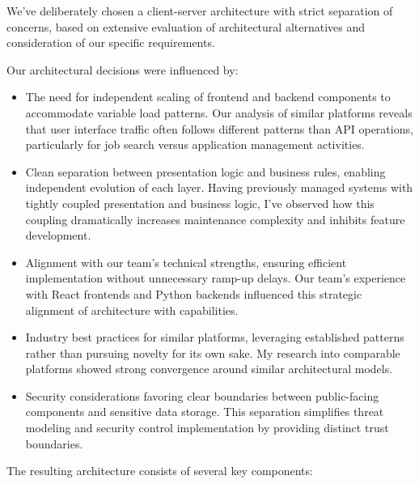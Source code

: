\documentclass[12pt,a4paper]{article}
\begin{document}
We've deliberately chosen a client-server architecture with strict separation of concerns, based on extensive evaluation of architectural alternatives and consideration of our specific requirements.

Our architectural decisions were influenced by:
\begin{itemize}
    \item The need for independent scaling of frontend and backend components to accommodate variable load patterns. Our analysis of similar platforms reveals that user interface traffic often follows different patterns than API operations, particularly for job search versus application management activities.
    \item Clean separation between presentation logic and business rules, enabling independent evolution of each layer. Having previously managed systems with tightly coupled presentation and business logic, I've observed how this coupling dramatically increases maintenance complexity and inhibits feature development.
    \item Alignment with our team's technical strengths, ensuring efficient implementation without unnecessary ramp-up delays. Our team's experience with React frontends and Python backends influenced this strategic alignment of architecture with capabilities.
    \item Industry best practices for similar platforms, leveraging established patterns rather than pursuing novelty for its own sake. My research into comparable platforms showed strong convergence around similar architectural models.
    \item Security considerations favoring clear boundaries between public-facing components and sensitive data storage. This separation simplifies threat modeling and security control implementation by providing distinct trust boundaries.
\end{itemize}

The resulting architecture consists of several key components:
\end{document}
